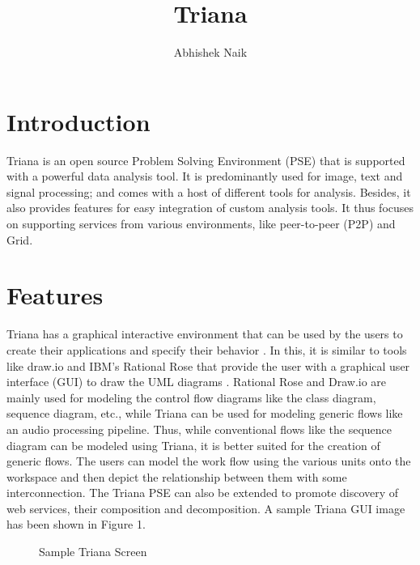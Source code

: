 \documentclass[9pt,twocolumn,twoside]{styles/osajnl}
\title{Triana}
\author{Abhishek Naik}
\affil[1]{School of Informatics and Computing, Bloomington, IN 47408, U.S.A.}
\affil[*]{Corresponding authors: ahnaik@indiana.edu}
\begin{document}
\maketitle

\section{Introduction}

Triana is an open source Problem Solving Environment (PSE) that is
supported with a powerful data analysis tool.  It is predominantly
used for image, text and signal processing; and comes with a host of
different tools for analysis.  Besides, it also provides features for
easy integration of custom analysis tools.  It thus focuses on
supporting services from various environments, like peer-to-peer (P2P)
and Grid.

\section{Features}
Triana has a graphical interactive environment that can be used by the
users to create their applications and specify their behavior
\cite{TrianaDocumentation1}.  In this, it is similar to tools like
draw.io and IBM's Rational Rose that provide the user with a graphical
user interface (GUI) to draw the UML diagrams \cite{DrawIO}
\cite{IBM-Rational-Rose}.  Rational Rose and Draw.io are mainly used
for modeling the control flow diagrams like the class diagram,
sequence diagram, etc., while Triana can be used for modeling generic
flows like an audio processing pipeline.  Thus, while conventional
flows like the sequence diagram can be modeled using Triana, it is
better suited for the creation of generic flows.  The users can model
the work flow using the various units onto the workspace and then
depict the relationship between them with some interconnection.  The
Triana PSE can also be extended to promote discovery of web services,
their composition and decomposition.  A sample Triana GUI image has
been shown in Figure 1.

\begin{figure}[htbp]
  \centering
  \caption{Sample Triana Screen \cite{TrianaDocumentation2}}
\end{figure}
\end{document}
